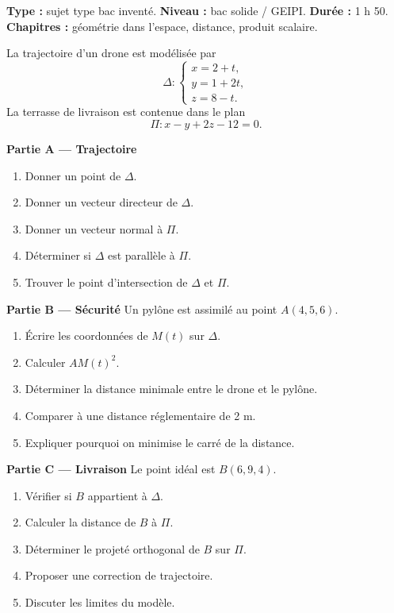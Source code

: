 \documentclass[11pt,a4paper]{article}
\begin{document}
\hypertarget{M-LONG-04}{}
\begin{sujettype}
\textbf{Type :} sujet type bac inventé.  
\textbf{Niveau :} bac solide / GEIPI.  
\textbf{Durée :} 1 h 50.  
\textbf{Chapitres :} géométrie dans l'espace, distance, produit scalaire.

La trajectoire d'un drone est modélisée par
\[
\Delta:
\begin{cases}
x=2+t,\\
y=1+2t,\\
z=8-t.
\end{cases}
\]
La terrasse de livraison est contenue dans le plan
\[
\Pi:x-y+2z-12=0.
\]

\textbf{Partie A — Trajectoire}
\begin{enumerate}
  \item Donner un point de $\Delta$.
  \item Donner un vecteur directeur de $\Delta$.
  \item Donner un vecteur normal à $\Pi$.
  \item Déterminer si $\Delta$ est parallèle à $\Pi$.
  \item Trouver le point d'intersection de $\Delta$ et $\Pi$.
\end{enumerate}

\textbf{Partie B — Sécurité}
Un pylône est assimilé au point $A(4,5,6)$.
\begin{enumerate}
  \item Écrire les coordonnées de $M(t)$ sur $\Delta$.
  \item Calculer $AM(t)^2$.
  \item Déterminer la distance minimale entre le drone et le pylône.
  \item Comparer à une distance réglementaire de 2 m.
  \item Expliquer pourquoi on minimise le carré de la distance.
\end{enumerate}

\textbf{Partie C — Livraison}
Le point idéal est $B(6,9,4)$.
\begin{enumerate}
  \item Vérifier si $B$ appartient à $\Delta$.
  \item Calculer la distance de $B$ à $\Pi$.
  \item Déterminer le projeté orthogonal de $B$ sur $\Pi$.
  \item Proposer une correction de trajectoire.
  \item Discuter les limites du modèle.
\end{enumerate}
\end{sujettype}
\end{document}
